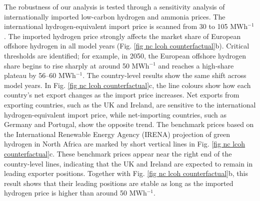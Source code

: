 \documentclass[pdflatex,sn-mathphys,Numbered]{sn-jnl}%
\begin{document}
The robustness of our analysis is tested through a sensitivity analysis of internationally imported low-carbon hydrogen and ammonia prices. The international hydrogen-equivalent import price is scanned from 30 to 105 \texteuro{} MWh$^{-1}$. The imported hydrogen price strongly affects the market share of European offshore hydrogen in all model years (Fig. \ref{fig nc lcoh counterfactual}b). Critical thresholds are identified; for example, in 2050, the European offshore hydrogen share begins to rise sharply at around 50 \texteuro{} MWh$^{-1}$ and reaches a high-share plateau by 56--60 \texteuro{} MWh$^{-1}$. The country-level results show the same shift across model years. In Fig. \ref{fig nc lcoh counterfactual}c, the line colours show how each country's net export changes as the import price increases. Net exports from exporting countries, such as the UK and Ireland, are sensitive to the international hydrogen-equivalent import price, while net-importing countries, such as Germany and Portugal, show the opposite trend. The benchmark prices based on the International Renewable Energy Agency (IRENA) projection of green hydrogen in North Africa \cite{IRENAGlobalHydrogenTradeOutlook2022} are marked by short vertical lines in Fig. \ref{fig nc lcoh counterfactual}c. These benchmark prices appear near the right end of the country-level lines, indicating that the UK and Ireland are expected to remain in leading exporter positions. Together with Fig. \ref{fig nc lcoh counterfactual}b, this result shows that their leading positions are stable as long as the imported hydrogen price is higher than around 50 \texteuro{} MWh$^{-1}$.
\end{document}
